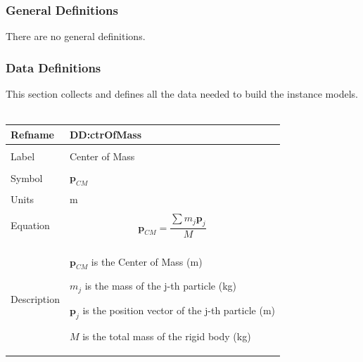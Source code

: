 \documentclass[12pt]{article}
\begin{document}
\subsubsection{General Definitions}
\label{Sec:GDs}
There are no general definitions.
\subsubsection{Data Definitions}
\label{Sec:DDs}
This section collects and defines all the data needed to build the instance models.
~\newline
 \noindent \begin{minipage}{\textwidth}
\begin{tabular}{p{} p{}}
\toprule \textbf{Refname} & \textbf{DD:ctrOfMass}
\label{DD:ctrOfMass}
\\ \midrule \\
Label & Center of Mass
        \\ \midrule \\
        Symbol & ${\mathbf{p}_{CM}}$
                 \\ \midrule \\
                 Units & m
                         \\ \midrule \\
                         Equation & \begin{displaymath}
                                    {\mathbf{p}_{CM}}=\frac{\displaystyle\sum{{m_{j}} {\mathbf{p}_{j}}}}{M}
                                    \end{displaymath}
                                    \\ \midrule \\
                                    Description & \begin{symbDescription}
                                                  \item{${\mathbf{p}_{CM}}$ is the Center of Mass (m)}
                                                  \item{${m_{j}}$ is the mass of the j-th particle (kg)}
                                                  \item{${\mathbf{p}_{j}}$ is the position vector of the j-th particle (m)}
                                                  \item{$M$ is the total mass of the rigid body (kg)}
                                                  \end{symbDescription}

\end{tabular}
\end{minipage}
\end{document}
